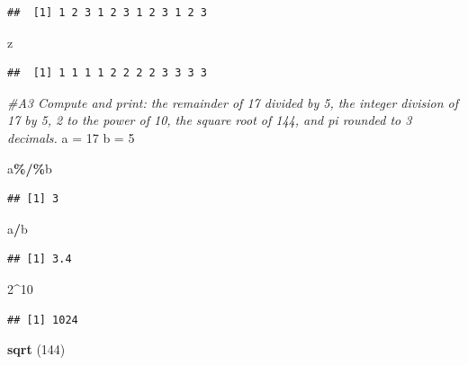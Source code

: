 \documentclass[
]{article}
\newenvironment{Shaded}{\begin{snugshade}}{\end{snugshade}}
\newcommand{\CommentTok}[1]{\textcolor[rgb]{0.56,0.35,0.01}{\textit{#1}}}
\newcommand{\DecValTok}[1]{\textcolor[rgb]{0.00,0.00,0.81}{#1}}
\newcommand{\FunctionTok}[1]{\textcolor[rgb]{0.13,0.29,0.53}{\textbf{#1}}}
\newcommand{\NormalTok}[1]{#1}
\newcommand{\OtherTok}[1]{\textcolor[rgb]{0.56,0.35,0.01}{#1}}
\newcommand{\SpecialCharTok}[1]{\textcolor[rgb]{0.81,0.36,0.00}{\textbf{#1}}}
\begin{document}
\begin{verbatim}
##  [1] 1 2 3 1 2 3 1 2 3 1 2 3
\end{verbatim}

\begin{Shaded}
\begin{Highlighting}[]
\NormalTok{z}
\end{Highlighting}
\end{Shaded}

\begin{verbatim}
##  [1] 1 1 1 1 2 2 2 2 3 3 3 3
\end{verbatim}

\begin{Shaded}
\begin{Highlighting}[]
\CommentTok{\#A3 Compute and print: the remainder of 17 divided by 5, the integer division of 17 by 5, 2 to the power of 10, the square root of 144, and pi rounded to 3 decimals.}
\NormalTok{a }\OtherTok{=} \DecValTok{17}
\NormalTok{b }\OtherTok{=} \DecValTok{5}

\NormalTok{a}\SpecialCharTok{\%/\%}\NormalTok{b}
\end{Highlighting}
\end{Shaded}

\begin{verbatim}
## [1] 3
\end{verbatim}

\begin{Shaded}
\begin{Highlighting}[]
\NormalTok{a}\SpecialCharTok{/}\NormalTok{b}
\end{Highlighting}
\end{Shaded}

\begin{verbatim}
## [1] 3.4
\end{verbatim}

\begin{Shaded}
\begin{Highlighting}[]
\DecValTok{2}\SpecialCharTok{\^{}}\DecValTok{10}
\end{Highlighting}
\end{Shaded}

\begin{verbatim}
## [1] 1024
\end{verbatim}

\begin{Shaded}
\begin{Highlighting}[]
\FunctionTok{sqrt}\NormalTok{ (}\DecValTok{144}\NormalTok{)}
\end{Highlighting}
\end{Shaded}
\end{document}
